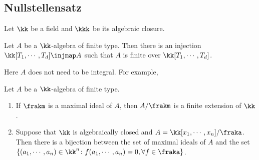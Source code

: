 \subsection{Nullstellensatz}

    Let \(\kk\) be a field and \(\kkk\) be its algebraic closure.

    \begin{theorem}\label{thm: Noether's Normalization Lemma}
        Let $A$ be a $\kk$-algebra of finite type.
        Then there is an injection $\kk[T_1,\cdots,T_d] \injmap A$ such that $A$ is finite over $\kk[T_1,\cdots,T_d]$.
    \end{theorem}

    \begin{remark}
        Here $A$ does not need to be integral. 
        For example, 
    \end{remark}

    \begin{theorem}\label{thm: Nullstellensatz}
        Let $A$ be a \(\kk\)-algebra of finite type.
        \begin{enumerate}
            \item If \(\frakm\) is a maximal ideal of \(A\), then \(A/\frakm\) is a finite extension of \(\kk\).
            \item Suppose that \(\kk\) is algebraically closed and \(A = \kk[x_1,\cdots,x_n]/\fraka\).
                Then there is a bijection between the set of maximal ideals of \(A\) and the set \( \{ (a_1,\cdots,a_n) \in \kk^n \colon f(a_1,\cdots,a_n) = 0, \forall f \in \fraka \} \).
        \end{enumerate}
    \end{theorem}
